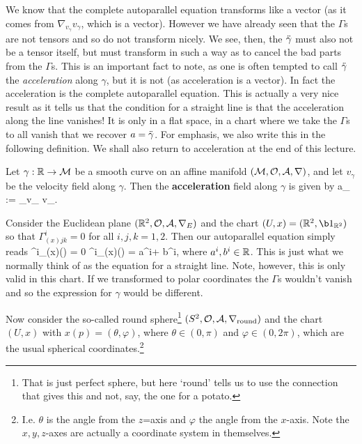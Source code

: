 \br
\label{rem:Acc}
    We know that the complete autoparallel equation transforms like a vector (as it comes from $\nabla_{v_{\gamma}}v_{\gamma}$, which is a vector). However we have already seen that the $\Gamma$s are not tensors and so do not transform nicely. We see, then, the $\Ddot{\gamma}$ must also not be a tensor itself, but must transform in such a way as to cancel the bad parts from the $\Gamma$s. This is an important fact to note, as one is often tempted to call $\Ddot{\gamma}$ the \textit{acceleration} along $\gamma$, but it is not (as acceleration is a vector). In fact the acceleration is the complete autoparallel equation. This is actually a very nice result as it tells us that the condition for a straight line is that the acceleration along the line vanishes! It is only in a flat space, in a chart where we take the $\Gamma$s to all vanish that we recover $a=\Ddot{\gamma}$. For emphasis, we also write this in the following definition. We shall also return to acceleration at the end of this lecture.
\er 

\bd[Acceleration]
    Let $\gamma:\mathbb{R}\to\mathcal{M}$ be a smooth curve on an affine manifold $(\mathcal{M},\mathcal{O},\mathcal{A},\nabla)$, and let $v_{\gamma}$ be the velocity field along $\gamma$. Then the \textbf{acceleration} field along $\gamma$ is given by 
    \bse 
        a_{\gamma} := \nabla_{v_{\gamma}} v_{\gamma}.
    \ese 
\ed 

\bex 
    Consider the Euclidean plane $(\mathbb{R}^2,\mathcal{O},\mathcal{A},\nabla_E)$ and the chart $(U,x) = (\R^2,\b1_{\R^2})$ so that $\Gamma^i_{(x)jk}=0$ for all $i,j,k=1,2$. Then our autoparallel equation simply reads 
    \bse 
        \Ddot{\gamma}^i_{(x)}(\lambda) = 0 \quad \implies \quad \gamma^i_{(x)}(\lambda) = a^i\lambda + b^i,
    \ese 
    where $a^i,b^i\in\mathbb{R}$. This is just what we normally think of as the equation for a straight line. Note, however, this is only valid in this chart. If we transformed to polar coordinates the $\Gamma$s wouldn't vanish and so the expression for $\gamma$ would be different.
\eex 

\bex 
    Now consider the so-called round sphere\footnote{That is just perfect sphere, but here `round' tells us to use the connection that gives this and not, say, the one for a potato.} $(S^2,\mathcal{O},\mathcal{A},\nabla_{\text{round}})$ and the chart $(U,x)$ with $x(p) = (\theta,\varphi)$, where $\theta \in (0,\pi)$ and $\varphi\in(0,2\pi)$, which are the usual spherical coordinates.\footnote{I.e. $\theta$ is the angle from the $z$=axis and $\varphi$ the angle from the $x$-axis. Note the $x,y,z$-axes are actually a coordinate system in themselves.} 
    
